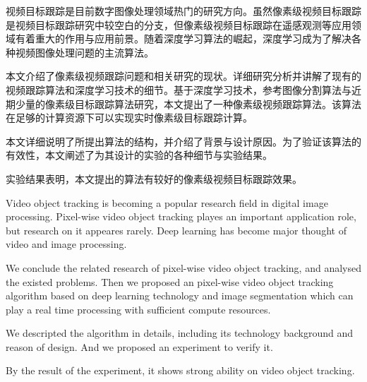 
\begin{cabstract}
	视频目标跟踪是目前数字图像处理领域热门的研究方向。虽然像素级视频目标跟踪是视频目标跟踪研究中较空白的分支，但像素级视频目标跟踪在遥感观测等应用领域有着重大的作用与应用前景。随着深度学习算法的崛起，深度学习成为了解决各种视频图像处理问题的主流算法。
	\par
	本文介绍了像素级视频跟踪问题和相关研究的现状。详细研究分析并讲解了现有的视频跟踪算法和深度学习技术的细节。基于深度学习技术，参考图像分割算法与近期少量的像素级目标跟踪算法研究，本文提出了一种像素级视频跟踪算法。该算法在足够的计算资源下可以实现实时像素级目标跟踪计算。
	\par
	本文详细说明了所提出算法的结构，并介绍了背景与设计原因。为了验证该算法的有效性，本文阐述了为其设计的实验的各种细节与实验结果。
	\par
	实验结果表明，本文提出的算法有较好的像素级视频目标跟踪效果。
\end{cabstract}

\begin{eabstract}
	Video object tracking is becoming a popular research field in digital image processing. Pixel-wise video object tracking playes an important application role, but research on it appeares rarely. Deep learning has become major thought of video and image processing.
	\par
	We conclude the related research of pixel-wise video object tracking, and analysed the existed problems. Then we proposed an pixel-wise video object tracking algorithm based on deep learning technology and image segmentation which can play a real time processing with sufficient compute resources.
	\par
	We descripted the algorithm in details, including its technology background and reason of design. And we proposed an experiment to verify it.
	\par
	By the result of the experiment, it shows strong ability on video object tracking.
\end{eabstract}

